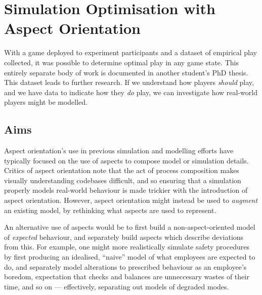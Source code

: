 \chapter{Simulation Optimisation with Aspect Orientation}\label{chap:exp1_simulation_optimisation}

With a game deployed to experiment participants and a dataset of empirical play
collected, it was possible to determine optimal play in any game state. This
entirely separate body of work is documented in another student's PhD
thesis. This dataset leads to
further research. If we understand how players \emph{should} play, and we have
data to indicate how they \emph{do} play, we can investigate how real-world
players might be modelled. 

\section{Aims}\label{sec:aop_simulation_optimisation_aims}

Aspect orientation's use in previous simulation and modelling efforts have
typically focused on the use of aspects to compose model or simulation
details.
Critics of aspect orientation note that
the act of process composition makes visually understanding codebases difficult,
and so ensuring that a simulation properly models real-world behaviour is made
trickier with the introduction of aspect orientation. However, aspect
orientation might instead be used to \emph{augment} an existing model, by
rethinking what aspects are used to represent.

An alternative use of aspects would be to first build a non-aspect-oriented
model of \emph{expected} behaviour, and separately build aspects which describe
deviations from this. For example, one might more realistically simulate safety
procedures by first producing an idealised, ``naive'' model of what employees
are expected to do, and separately model alterations to prescribed behaviour as
an employee's boredom, expectation that checks and balances are unneccesary
wastes of their time, and so on --- effectively, separating out models of
degraded modes\cite{johnson2007degradedmodes}.

